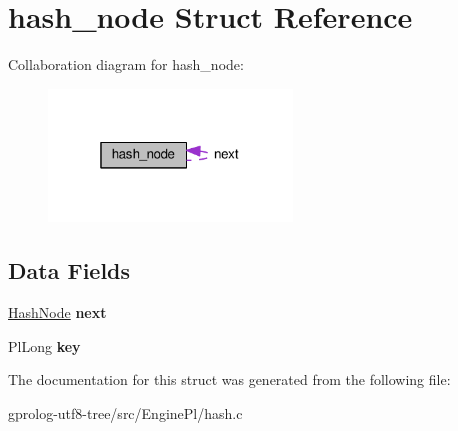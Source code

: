 \hypertarget{structhash__node}{}\section{hash\+\_\+node Struct Reference}
\label{structhash__node}


Collaboration diagram for hash\+\_\+node\+:\nopagebreak
\begin{figure}[H]
\begin{center}
\leavevmode
\includegraphics[width=184pt]{structhash__node__coll__graph}
\end{center}
\end{figure}
\subsection*{Data Fields}
\begin{DoxyCompactItemize}
\item 
\hyperlink{structhash__node}{Hash\+Node} {\bfseries next}\hypertarget{structhash__node_a37ad6e543029e7eef401f8be7a984689}{}\label{structhash__node_a37ad6e543029e7eef401f8be7a984689}

\item 
Pl\+Long {\bfseries key}\hypertarget{structhash__node_aa9c0ed0ab7bc110696244024900e9419}{}\label{structhash__node_aa9c0ed0ab7bc110696244024900e9419}

\end{DoxyCompactItemize}


The documentation for this struct was generated from the following file\+:\begin{DoxyCompactItemize}
\item 
gprolog-\/utf8-\/tree/src/\+Engine\+Pl/hash.\+c\end{DoxyCompactItemize}
